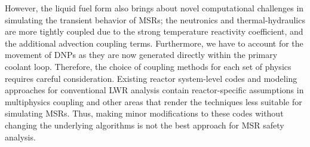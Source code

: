 However, the liquid fuel form also brings about novel computational
challenges in simulating the transient behavior of \glspl{MSR}; the
neutronics and thermal-hydraulics are more tightly coupled due to the strong
temperature reactivity coefficient, and the additional advection coupling
terms. Furthermore, we have to account for the movement of \glspl{DNP} as
they are now generated directly within the primary coolant loop. Therefore,
the choice of coupling methods for each set of physics requires careful
consideration. Existing reactor system-level codes and modeling approaches
for conventional \gls{LWR} analysis contain reactor-specific assumptions in
multiphysics coupling and other areas that render the techniques less suitable
for simulating \glspl{MSR}. Thus, making minor modifications to these codes
without changing the underlying algorithms is not the best approach for
\gls{MSR} safety analysis.

